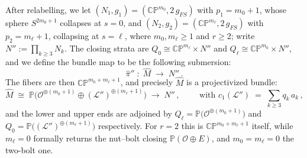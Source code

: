 \documentclass[11pt]{amsart}
\theoremstyle{plain}
\numberwithin{equation}{section}
\theoremstyle{definition}
\theoremstyle{remark}
\begin{document}
After relabelling, we let $( N_1, g_1 ) = ( \mathbb{CP}^{m_0}, 2\, g_{FS} )$ with $p_1 = m_0 + 1$, whose sphere $S^{2 m_0 + 1}$ collapses at $s = 0$, and $( N_2, g_2 ) = ( \mathbb{CP}^{m_\ell}, 2\, g_{FS} )$ with $p_2 = m_\ell + 1$, collapsing at $s = \ell$, where $m_0, m_\ell \geq 1$ and $r \geq 2$; write $N'' := \prod_{k \geq 3} N_k$. The closing strata are $Q_0 \cong \mathbb{CP}^{m_\ell} \times N''$ and $Q_\ell \cong \mathbb{CP}^{m_0} \times N''$, and we define the bundle map to be the following submersion:
\[
\widehat{\pi}'' \;:\; \widehat{M} \;\longrightarrow\; N'' \,.
\]
The fibers are then $\mathbb{CP}^{m_0 + m_\ell + 1}$, and precisely $\widehat{M}$ is a projectivized bundle:
\[
\widehat{M} \;\cong\; \mathbb{P} \big( \mathcal{O}^{\oplus ( m_0 + 1 )} \oplus ( \mathcal{L}'' )^{\oplus ( m_\ell + 1 )} \big) \;\longrightarrow\; N'' \,, \qquad \text{ with } c_1 ( \mathcal{L}'' ) \;=\; \sum_{k \geq 3} q_k\, a_k \,,
\]
and the lower and upper ends are adjoined by $Q_\ell = \mathbb{P} \big( \mathcal{O}^{\oplus ( m_0 + 1 )} \big)$ and $Q_0 = \mathbb{P} \big( ( \mathcal{L}'' )^{\oplus ( m_\ell + 1 )} \big)$ respectively. For $r = 2$ this is $\mathbb{CP}^{m_0 + m_\ell + 1}$ itself, while $m_\ell = 0$ formally returns the nut--bolt closing $\mathbb{P} ( \mathcal{O} \oplus E )$, and $m_0 = m_\ell = 0$ the two-bolt one.
\end{document}
